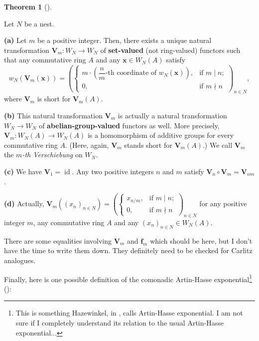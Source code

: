 \documentclass[numbers=enddot,12pt,final,onecolumn,notitlepage]{scrartcl}%
\theoremstyle{definition}
\newtheorem{theo}{Theorem}[section]
\newenvironment{theorem}[1][]
{\begin{theo}[#1]\begin{leftbar}}
{\end{leftbar}\end{theo}}
\begin{document}
\begin{theorem}
\label{thm.Witt.ver}Let $N$ be a nest.

\textbf{(a)} Let $m$ be a positive integer. Then, there exists a unique
natural transformation $\mathbf{V}_{m}:W_{N}\rightarrow W_{N}$ of
\textbf{set-valued} (not ring-valued) functors such that any commutative ring
$A$ and any $\mathbf{x}\in W_{N}\left(  A\right)  $ satisfy%
\[
w_{N}\left(  \mathbf{V}_{m}\left(  \mathbf{x}\right)  \right)  =\left(
\begin{cases}
m\cdot\left(  \dfrac{n}{m}\text{-th coordinate of }w_{N}\left(  \mathbf{x}%
\right)  \right)  , & \text{if }m\mid n;\\
0, & \text{if }m\nmid n
\end{cases}
\right)  _{n\in N},
\]
where $\mathbf{V}_{m}$ is short for $\mathbf{V}_{m}\left(  A\right)  $.

\textbf{(b)} This natural transformation $\mathbf{V}_{m}$ is actually a
natural transformation $W_{N}\rightarrow W_{N}$ of
\textbf{abelian-group-valued} functors as well. More precisely, $\mathbf{V}%
_{m}:W_{N}\left(  A\right)  \rightarrow W_{N}\left(  A\right)  $ is a
homomorphism of additive groups for every commutative ring $A$. (Here, again,
$\mathbf{V}_{m}$ stands short for $\mathbf{V}_{m}\left(  A\right)  $.) We call
$\mathbf{V}_{m}$ the $m$\textit{-th Verschiebung} on $W_{N}$.

\textbf{(c)} We have $\mathbf{V}_{1}=\operatorname*{id}$. Any two positive
integers $n$ and $m$ satisfy $\mathbf{V}_{n}\circ\mathbf{V}_{m}=\mathbf{V}%
_{nm}$.

\textbf{(d)} Actually, $\mathbf{V}_{m}\left(  \left(  x_{n}\right)  _{n\in
N}\right)  =\left(
\begin{cases}
x_{n/m}, & \text{if }m\mid n;\\
0, & \text{if }m\nmid n
\end{cases}
\right)  _{n\in N}$ for any positive integer $m$, any commutative ring $A$ and
any $\left(  x_{n}\right)  _{n\in N}\in W_{N}\left(  A\right)  $.
\end{theorem}

There are some equalities involving $\mathbf{V}_{m}$ and $\mathbf{f}_{m}$
which should be here, but I don't have the time to write them down. They
definitely need to be checked for Carlitz analogues.

Finally, here is one possible definition of the comonadic Artin-Hasse
exponential\footnote{This is something Hazewinkel, in \cite[\S 16.45]%
{hw-witt1}, calls Artin-Hasse exponential. I am not sure if I completely
understand its relation to the usual Artin-Hasse exponential...}
(\cite[Corollary 6.3]{rabinoff-witt}):
\end{document}
